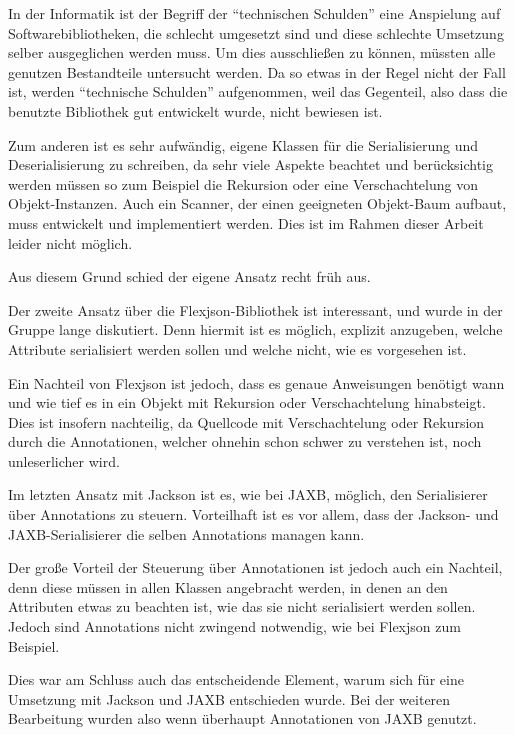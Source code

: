 In der Informatik ist der Begriff der "`technischen Schulden"' eine Anspielung auf Softwarebibliotheken, die schlecht umgesetzt sind und diese schlechte Umsetzung selber ausgeglichen werden muss. Um dies ausschlie\ss{}en zu k\"onnen, m\"ussten alle genutzen Bestandteile untersucht werden. Da so etwas in der Regel nicht der Fall ist, werden "`technische Schulden"' aufgenommen, weil das Gegenteil, also dass die benutzte Bibliothek gut entwickelt wurde, nicht bewiesen ist.

Zum anderen ist es sehr aufw\"andig, eigene Klassen f\"ur die Serialisierung und Deserialisierung zu schreiben, da sehr viele Aspekte beachtet und ber\"ucksichtig werden m\"ussen so zum Beispiel die Rekursion oder eine Verschachtelung von Objekt-Instanzen. Auch ein Scanner, der einen geeigneten Objekt-Baum aufbaut, muss entwickelt und implementiert werden. Dies ist im Rahmen dieser Arbeit leider nicht m\"oglich.

Aus diesem Grund schied der eigene Ansatz recht fr\"uh aus.

Der zweite Ansatz \"uber die Flexjson-Bibliothek ist interessant, und wurde in der Gruppe lange diskutiert. Denn hiermit ist es m\"oglich, explizit anzugeben, welche Attribute serialisiert werden sollen und welche nicht, wie es vorgesehen ist.

Ein Nachteil von Flexjson ist jedoch, dass es genaue Anweisungen ben\"otigt wann und wie tief es in ein Objekt mit Rekursion oder Verschachtelung hinabsteigt. Dies ist insofern nachteilig, da Quellcode mit Verschachtelung oder Rekursion durch die Annotationen, welcher ohnehin schon schwer zu verstehen ist, noch unleserlicher wird.

Im letzten Ansatz mit Jackson ist es, wie bei \ac{JAXB}, m\"oglich, den Serialisierer \"uber Annotations zu steuern. Vorteilhaft ist es vor allem, dass der Jackson- und \ac{JAXB}-Serialisierer die selben Annotations managen kann. 

Der gro\ss{}e Vorteil der Steuerung \"uber Annotationen ist jedoch auch ein Nachteil, denn diese m\"ussen in allen Klassen angebracht werden, in denen an den Attributen etwas zu beachten ist, wie das sie nicht serialisiert werden sollen. Jedoch sind Annotations nicht zwingend notwendig, wie bei Flexjson zum Beispiel.

Dies war am Schluss auch das entscheidende Element, warum sich f\"ur eine Umsetzung mit Jackson und \ac{JAXB} entschieden wurde. Bei der weiteren Bearbeitung wurden also wenn \"uberhaupt Annotationen von \ac{JAXB} genutzt.

